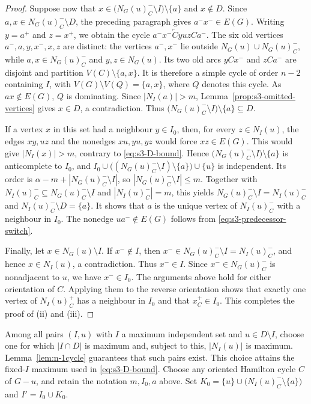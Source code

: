 \documentclass[11pt]{article}
\numberwithin{equation}{section}
\theoremstyle{plain}
\theoremstyle{definition}
\theoremstyle{plain}
\begin{document}
\begin{proof}
Suppose now that
$x\in\bigl(N_G(u)_C^-\setminus I\bigr)\setminus\{a\}$ and
$x\notin D$.
Since $a,x\in N_G(u)_C^-\setminus D$, the preceding paragraph gives
$a^-x^-\in E(G)$.
Writing $y=a^+$ and $z=x^+$, we obtain the cycle
$a^-x^-\overleftarrow{C}yuzCa^-$.
The six old vertices $a^-,a,y,x^-,x,z$ are distinct: the vertices
$a^-,x^-$ lie outside $N_G(u)\cup N_G(u)_C^-$, while
$a,x\in N_G(u)_C^-$ and $y,z\in N_G(u)$.
Its two old arcs $yCx^-$ and $zCa^-$ are disjoint and partition
$V(C)\setminus\{a,x\}$.
It is therefore a simple cycle of order $n-2$ containing $I$, with
$V(G)\setminus V(Q)=\{a,x\}$, where $Q$ denotes this cycle.
As $ax\notin E(G)$, $Q$ is dominating. Since $|N_I(a)|>m$,
Lemma~\ref{prop:s3-omitted-vertices} gives $x\in D$, a
contradiction.
Thus
$\bigl(N_G(u)_C^-\setminus I\bigr)\setminus\{a\}\subseteq D$.

If a vertex $x$ in this set had a neighbour $y\in I_0$, then, for
every $z\in N_I(u)$, the edges $xy,uz$ and the nonedges
$xu,yu,yz$ would force $xz\in E(G)$.
This would give $|N_I(x)|>m$, contrary to
\eqref{eq:s3-D-bound}.
Hence
$\bigl(N_G(u)_C^-\setminus I\bigr)\setminus\{a\}$
is anticomplete to $I_0$, and
$I_0\cup\bigl((N_G(u)_C^-\setminus I)\setminus\{a\}\bigr)
\cup\{u\}$ is independent.
Its order is $\alpha-m+|N_G(u)_C^-\setminus I|$, so
$|N_G(u)_C^-\setminus I|\leq m$.
Together with
$N_I(u)_C^-\subseteq N_G(u)_C^-\setminus I$ and
$|N_I(u)_C^-|=m$, this yields
$N_G(u)_C^-\setminus I=N_I(u)_C^-$ and
$N_I(u)_C^-\setminus D=\{a\}$.
It    shows that $a$ is the unique vertex of $N_I(u)_C^-$ with
a neighbour in $I_0$.
The nonedge $ua^-\notin E(G)$ follows from
\eqref{eq:s3-predecessor-switch}.

Finally, let $x\in N_G(u)\setminus I$.
If $x^-\notin I$, then
$x^-\in N_G(u)_C^-\setminus I=N_I(u)_C^-$, and hence
$x\in N_I(u)$, a contradiction.
Thus $x^-\in I$.
Since $x^-\in N_G(u)_C^-$ is nonadjacent to $u$, we have
$x^-\in I_0$.
The arguments above hold for either orientation of $C$.
Applying them to the reverse orientation shows that exactly one
vertex of $N_I(u)_C^+$ has a neighbour in $I_0$ and that
$x_C^+\in I_0$.
This completes the proof of \textup{(ii)} and \textup{(iii)}.
\end{proof}

Among all pairs $(I,u)$ with $I$ a maximum independent set and
$u\in D\setminus I$, choose one for which $|I\cap D|$ is maximum and,
subject to this, $|N_I(u)|$ is maximum.
Lemma~\ref{lem:n-1cycle} guarantees that such pairs exist.
This choice    attains the fixed-$I$ maximum used in
\eqref{eq:s3-D-bound}.
Choose any oriented Hamilton cycle $C$ of $G-u$, and retain the
notation $m,I_0,a$ above.
  Set $K_0=\{u\}\cup\bigl(N_I(u)_C^-\setminus\{a\}\bigr)$ and
$I'=I_0\cup K_0$.
\end{document}
